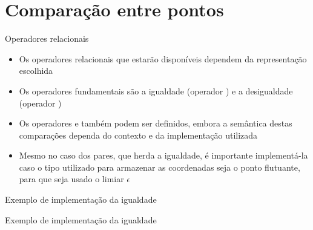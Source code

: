 \section{Comparação entre pontos}

\begin{frame}[fragile]{Operadores relacionais}

    \begin{itemize}
        \item Os operadores relacionais que estarão disponíveis dependem da representação
            escolhida
        \pause

        \item Os operadores fundamentais são a igualdade (operador ) e a 
            desigualdade (operador )
        \pause

        \item Os operadores  e  também podem ser definidos, embora a 
            semântica destas comparações dependa do contexto e da implementação utilizada
        \pause

        \item Mesmo no caso dos pares, que herda a igualdade, é importante implementá-la caso
            o tipo utilizado para armazenar as coordenadas seja o ponto flutuante, para que
            seja usado o limiar $\epsilon$
   \end{itemize}

\end{frame}

\begin{frame}[fragile]{Exemplo de implementação da igualdade}
\end{frame}

\begin{frame}[fragile]{Exemplo de implementação da igualdade}
\end{frame}
